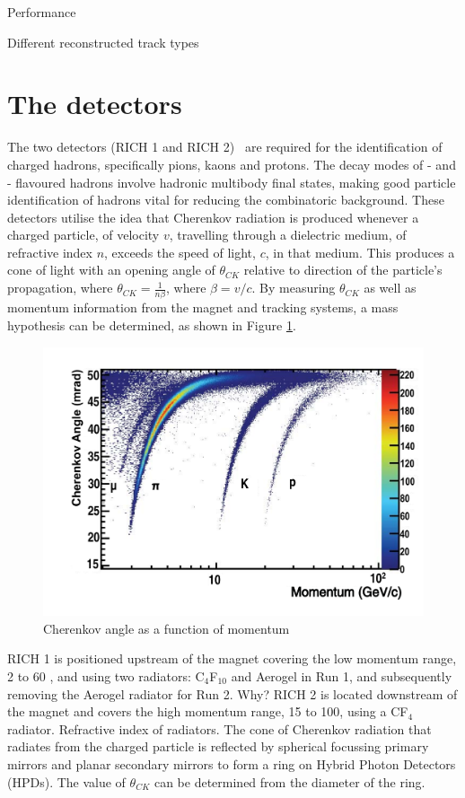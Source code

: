 Performance~\cite{LHCb-DP-2013-002, LHCb-DP-2013-003}

Different reconstructed track types

\section{The \rich detectors}

The two \rich detectors (RICH 1 and RICH 2)~\cite{LHCb-DP-2012-003} are required for the identification of charged hadrons, specifically pions, kaons and protons. The decay modes of \bquark- and \cquark- flavoured hadrons involve hadronic multibody final states, making good particle identification of hadrons vital for reducing the combinatoric background. These detectors utilise the idea that Cherenkov radiation is produced whenever a charged particle, of velocity $v$, travelling through a dielectric medium, of refractive index $n$, exceeds the speed of light, $c$, in that medium. This produces a cone of light with an opening angle of $\theta_{CK}$ relative to direction of the particle's propagation, where $\theta_{CK} = \frac{1}{n\beta}$, where $\beta = v/c$. By measuring $\theta_{CK}$ as well as momentum information from the magnet and tracking systems, a mass hypothesis can be determined, as shown in Figure \ref{richseparation}.

\begin{figure}
\centering
\includegraphics[width=0.8\linewidth]{figures/detector/richseparation.pdf}
\caption{Cherenkov angle as a function of momentum}
\label{richseparation}
\end{figure}

RICH 1 is positioned upstream of the magnet covering the low momentum range, 2 to 60 \gevc, and using two radiators: C$_4$F$_{10}$ and Aerogel in Run 1, and subsequently removing the Aerogel radiator for Run 2. Why? RICH 2 is located downstream of the magnet and covers the high momentum range, 15 to 100\gevc, using a CF$_4$ radiator. Refractive index of radiators. The cone of Cherenkov radiation that radiates from the charged particle is reflected by spherical focussing primary mirrors and planar secondary mirrors to form a ring on Hybrid Photon Detectors (HPDs). The value of $\theta_{CK}$ can be determined from the diameter of the ring. 

